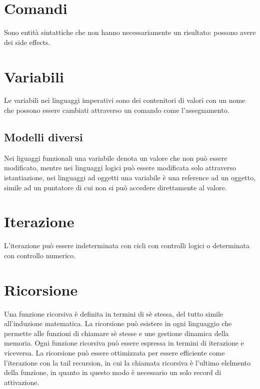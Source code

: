 \section{Comandi}
Sono entit\`a sintattiche che non hanno necessariamente un risultato: possono avere dei side effects.
\section{Variabili}
Le variabili nei linguaggi imperativi sono dei contenitori di valori con un nome che possono essere cambiati attraverso un comando come l'assegnamento.
\subsection{Modelli diversi}
Nei liguaggi funzionali una variabile denota un valore che non pu\`o essere modificato, mentre nei linguaggi logici pu\`o essere modificata solo attraverso istantiazione, 
nei linguaggi ad oggetti una variabile \`e una reference ad un oggetto, simile ad un puntatore di cui non si pu\`o accedere direttamente al valore. 
\section{Iterazione}
L'iterazione pu\`o essere indeterminata con cicli con controlli logici o determinata con controllo numerico.
\section{Ricorsione}
Una funzione ricorsiva \`e definita in termini di s\`e stessa, del tutto simile all'induzione matematica. La ricorsione pu\`o esistere in ogni linguaggio che permette alle 
funzioni di chiamare s\`e stesse e une gestione dinamica della memoria. Ogni funzione ricorsiva pu\`o essere espressa in termini di iterazione e viceversa. La ricorsione pu\`o
essere ottimizzata per essere efficiente come l'iterazione con la tail recursion, in cui la chiamata ricorsiva \`e l'ultimo elelmento della funzione, in quanto in questo modo 
\`e necessario un solo record di attivazione. 

